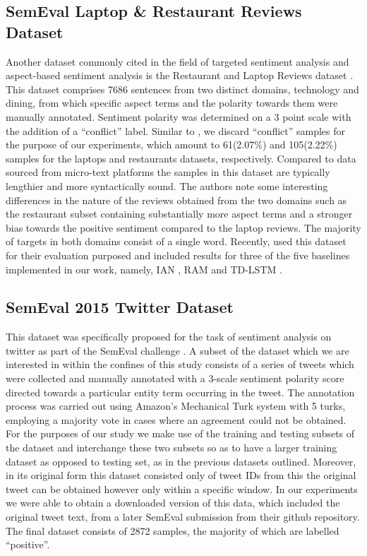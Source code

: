 \documentclass[../../fyp.tex]{subfiles}
\begin{document}
\subsection{SemEval Laptop \& Restaurant Reviews Dataset} \label{ds:pontiki}
Another dataset commonly cited in the field of targeted sentiment analysis and aspect-based sentiment analysis is the Restaurant and Laptop Reviews dataset \citep{pontiki}. This dataset comprises 7686 sentences from two distinct domains, technology and dining, from which specific aspect terms and the polarity towards them were manually annotated. Sentiment polarity was determined on a 3 point scale with the addition of a \enquote{conflict} label. Similar to \citet{dehongma2017,chen2017,tang2016b}, we discard \enquote{conflict} samples for the purpose of our experiments, which amount to 61(2.07\%) and 105(2.22\%) samples for the laptops and restaurants datasets, respectively. Compared to data sourced from micro-text platforms the samples in this dataset are typically lengthier and more syntactically sound. The authors note some interesting differences in the nature of the reviews obtained from the two domains such as the restaurant subset containing substantially more aspect terms and a stronger bias towards the positive sentiment compared to the laptop reviews. The majority of targets in both domains consist of a single word. Recently, \citet{xue2018} used this dataset for their evaluation purposed and included results for three of the five baselines implemented in our work, namely, IAN \citep{dehongma2017}, RAM \citep{chen2017} and TD-LSTM \citep{tang2016b}.

\subsection{SemEval 2015 Twitter Dataset} \label{ds:resenthal}
This dataset was specifically proposed for the task of sentiment analysis on twitter as part of the SemEval challenge \citep{rosenthal2015}. A subset of the dataset which we are interested in within the confines of this study consists of a series of tweets which were collected and manually annotated with a 3-scale sentiment polarity score directed towards a particular entity term occurring in the tweet. The annotation process was carried out using Amazon's Mechanical Turk system with 5 turks, employing a majority vote in cases where an agreement could not be obtained. For the purposes of our study we make use of the training and testing subsets of the dataset and interchange these two subsets so as to have a larger training dataset as opposed to testing set, as in the previous datasets outlined. Moreover, in its original form this dataset consisted only of tweet IDs  from this the original tweet can be obtained however only within a specific window. In our experiments we were able to obtain a  downloaded version of this data, which included the original tweet text, from a later SemEval submission \citep{baziotis2017} from their github repository. The final dataset consists of 2872 samples, the majority of which are labelled \enquote{positive}.
\end{document}
